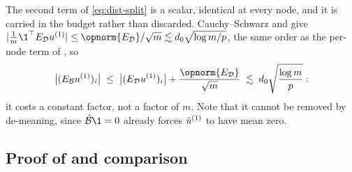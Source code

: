 \begin{remark}\label{rem:dist-centering}
The second term of \eqref{eq:dist-split} is a scalar, identical at every node, and
it is carried in the budget rather than discarded. Cauchy--Schwarz and
 give
$|\tfrac1m\1^\top E_{\Dmat}\uone|\le\opnorm{E_{\Dmat}}/\sqrt m\lesssim
d_0\sqrt{\log m/p}$, the same order as the per-node term of
, so
\begin{equation}\label{eq:dist-EBu}
   \bigl|(E_{\Bop}\uone)_i\bigr|\;\le\;\bigl|(E_{\Dmat}\uone)_i\bigr|
        +\frac{\opnorm{E_{\Dmat}}}{\sqrt m}\;\lesssim\;d_0\sqrt{\frac{\log m}{p}} :
\end{equation}
it costs a constant factor, not a factor of $m$. Note that it cannot be removed by
de-meaning, since $\hat\Bop\1=0$ already forces $\hat u^{(1)}$ to have mean zero.
\end{remark}

\subsection{Proof of \texorpdfstring{}{Theorem 2} and comparison}\label{app:dist-main}


